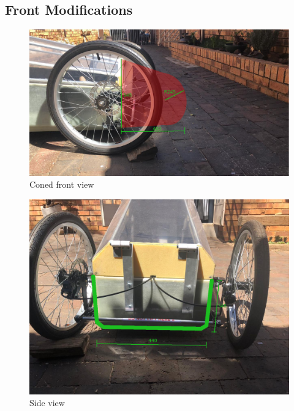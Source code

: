 \documentclass[a4paper, 12pt]{article}
\begin{document}
	\newpage
	\begin{appendices}
		\section{Front Modifications}
		\label{sec:front_modification}

			\begin{figure}[H]
				\centering
				\includegraphics[width = 150mm]{img/Front_Side_View_Coned.png}
				\caption{Coned front view}
				\label{fig:front_side_view_coned}
			\end{figure}

			\begin{figure}[H]
				\centering
				\includegraphics[width = 150mm]{img/Front_View_Dimensions.png}
				\caption{Side view}
				\label{fig:front_view_dimensions}
			\end{figure}

	


\end{appendices}
\end{document}
